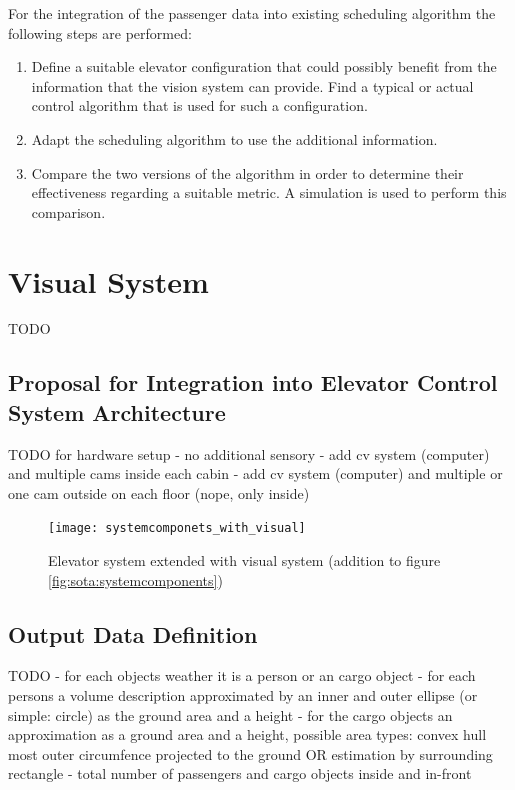 For the integration of the  passenger data into existing scheduling algorithm the following steps are performed:

\begin{enumerate}
    \item Define a suitable elevator configuration that could possibly benefit from the information that the vision system can provide. 
    Find a typical or actual control algorithm that is used for such a configuration.
    \item Adapt the scheduling algorithm to use the additional information.
    \item Compare the two versions of the algorithm in order to determine their effectiveness regarding a suitable metric.
    A simulation is used to perform this comparison.
\end{enumerate}

 
\section{Visual System}
TODO
\subsection{Proposal for Integration into Elevator Control System Architecture}
TODO
for hardware setup
- no additional sensory
- add cv system (computer) and multiple cams inside each cabin
- add cv system (computer) and multiple or one cam outside on each floor (nope, only inside)

\begin{figure}
    \centering
    \texttt{[image: systemcomponets\_with\_visual]}
    \caption{Elevator system extended with visual system (addition to figure \ref{fig:sota:systemcomponents})}
    \label{fig:design:systeminteration}
\end{figure}

\subsection{Output Data Definition}
TODO
- for each objects weather it is a person or an cargo object
- for each persons a volume description approximated by an inner and outer ellipse (or simple: circle) as the ground area and a height
- for the cargo objects an approximation as a ground area and a height, possible area types: convex hull most outer circumfence projected to the ground OR estimation by surrounding rectangle
- total number of passengers and cargo objects inside and in-front
